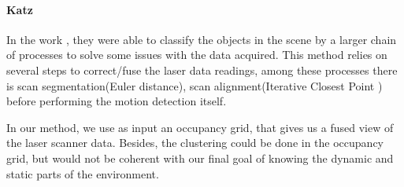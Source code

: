 \paragraph*{Katz}

In the work \cite{4650636}, they were able to classify the objects in the scene by a larger chain of processes to solve some issues with the data acquired. This method relies on several steps to correct/fuse the laser data readings, among these processes there is scan segmentation(Euler distance), scan alignment(Iterative Closest Point \cite{10.1109/34.121791}) before performing the motion detection itself. 

In our method, we use as input an occupancy grid, %
that gives us a fused view of the laser scanner data. Besides, the clustering could be done in the occupancy grid, but would not be coherent with our final goal of knowing the dynamic and static parts of the environment.


